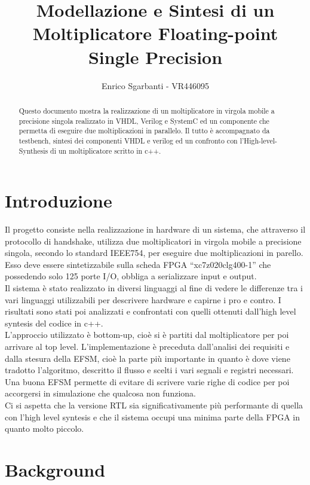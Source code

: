 \documentclass[]{IEEEtran}
\title{Modellazione e Sintesi di un Moltiplicatore Floating-point Single Precision}
\author{Enrico Sgarbanti - VR446095}
\begin{document}
\maketitle



\begin{abstract}
    Questo documento mostra la realizzazione di un moltiplicatore in virgola mobile a precisione singola realizzato in VHDL, Verilog e SystemC ed un componente che permetta di eseguire due moltiplicazioni in parallelo. Il tutto è accompagnato da testbench, sintesi dei componenti VHDL e verilog ed un confronto con l'High-level-Synthesis di un moltiplicatore scritto in c++.
\end{abstract}



\section{Introduzione}
Il progetto consiste nella realizzazione in hardware di un sistema, che attraverso il protocollo di handshake, utilizza due moltiplicatori in virgola mobile a precisione singola, secondo lo standard IEEE754, per eseguire due moltiplicazioni in parello. Esso deve essere sintetizzabile sulla scheda FPGA ``xc7z020clg400-1'' che possedendo solo 125 porte I/O, obbliga a serializzare input e output.
\\Il sistema è stato realizzato in diversi linguaggi al fine di vedere le differenze tra i vari linguaggi utilizzabili per descrivere hardware e capirne i pro e contro. I risultati sono stati poi analizzati e confrontati con quelli ottenuti dall'high level syntesis del codice in c++.
\\L'approccio utilizzato è bottom-up, cioè si è partiti dal moltiplicatore per poi arrivare al top level. L'implementazione è preceduta dall'analisi dei requisiti e dalla stesura della EFSM, cioè la parte più importante in quanto è dove viene tradotto l'algoritmo, descritto il flusso e scelti i vari segnali e registri necessari. Una buona EFSM permette di evitare di scrivere varie righe di codice per poi accorgersi in simulazione che qualcosa non funziona.
\\Ci si aspetta che la versione RTL sia significativamente più performante di quella con l'high level syntesis e che il sistema occupi una minima parte della FPGA in quanto molto piccolo.



\section{Background}
\end{document}
